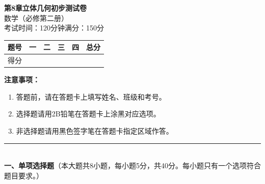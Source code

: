 \documentclass[12pt, a4paper]{ctexart}
\begin{document}
\begin{center}
{\Large\bfseries 第8章\quad 立体几何初步\quad 测试卷}\\[6pt]
{\normalsize 数学（必修第二册）}\\[4pt]
{\small 考试时间：120分钟\quad 满分：150分}
\end{center}

\vspace{2pt}
\begin{center}
\begin{tabular}{|c|c|c|c|c|}
\hline
题号 & 一 & 二 & 三 & 四 & 总分 \\ \hline
得分 & & & & & \\ \hline
\end{tabular}
\end{center}
\vspace{4pt}

\noindent\textbf{注意事项：}
\begin{enumerate}[leftmargin=2em]
  \item 答题前，请在答题卡上填写姓名、班级和考号。
  \item 选择题请用2B铅笔在答题卡上涂黑对应选项。
  \item 非选择题请用黑色签字笔在答题卡指定区域作答。
\end{enumerate}

\vspace{6pt}

\noindent\rule{\textwidth}{0.4pt}\\[2pt]
{\large\bfseries 一、单项选择题}（本大题共8小题，每小题5分，共40分。每小题只有一个选项符合题目要求。）

\vspace{6pt}
\end{document}
